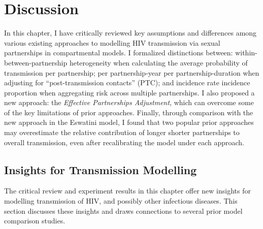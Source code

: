 \section{Discussion}\label{foi.disc} 
In this chapter, I have critically reviewed
key assumptions and differences among various existing approaches to modelling
HIV transmission via sexual partnerships in compartmental models.
I formalized distinctions between:
within- \vs between-partnership heterogeneity
when calculating the average probability of transmission per partnership;
per partnership-year \vs per partnership-duration
when adjusting for ``post-transmission contacts'' (PTC); and
incidence rate \vs incidence proportion
when aggregating risk across multiple partnerships.
I also proposed a new approach: the \emph{Effective Partnerships Adjustment},
which can overcome some of the key limitations of prior approaches.
Finally, through comparison with the new approach in the Eswatini model,
I found that two popular prior approaches may overestimate
the relative contribution of longer \vs shorter partnerships to overall transmission,
even after recalibrating the model under each approach.
\subsection{Insights for Transmission Modelling}\label{foi.disc.ins}
The critical review and experiment results in this chapter
offer new insights for modelling transmission of HIV, and possibly other infectious diseases.
This section discusses these insights
and draws connections to several prior model comparison studies.
